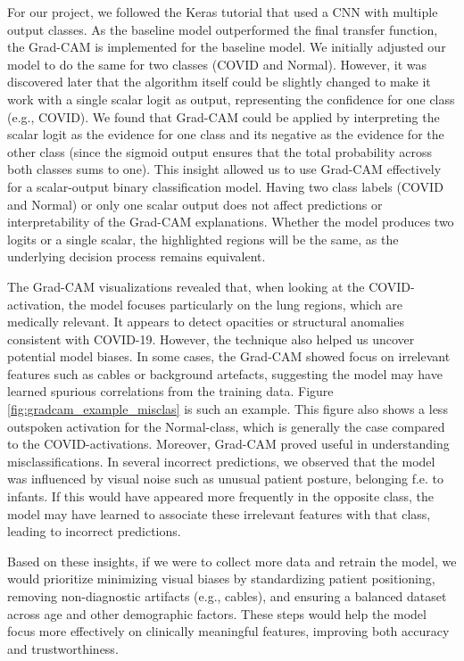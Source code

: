 \documentclass[conference]{IEEEtran}
\begin{document}
For our project, we followed the Keras tutorial \cite{KerasTutorial} that used a CNN with multiple output classes. As the baseline model outperformed the final transfer function, the Grad-CAM is implemented for the baseline model. We initially adjusted our model to do the same for two classes (COVID and Normal). However, it was discovered later that the algorithm itself could be slightly changed to make it work with a single scalar logit as output, representing the confidence for one class (e.g., COVID). We found that Grad-CAM could be applied by interpreting the scalar logit as the evidence for one class and its negative as the evidence for the other class (since the sigmoid output ensures that the total probability across both classes sums to one). This insight allowed us to use Grad-CAM effectively for a scalar-output binary classification model. Having two class labels (COVID and Normal) or only one scalar output does not affect predictions or interpretability of the Grad-CAM explanations. Whether the model produces two logits or a single scalar, the highlighted regions will be the same, as the underlying decision process remains equivalent.

The Grad-CAM visualizations revealed that, when looking at the COVID-activation, the model focuses particularly on the lung regions, which are medically relevant. It appears to detect opacities or structural anomalies consistent with COVID-19. However, the technique also helped us uncover potential model biases. In some cases, the Grad-CAM showed focus on irrelevant features such as cables or background artefacts, suggesting the model may have learned spurious correlations from the training data. Figure \ref{fig:gradcam_example_misclas} is such an example. This figure also shows a less outspoken activation for the Normal-class, which is generally the case compared to the COVID-activations.
Moreover, Grad-CAM proved useful in understanding misclassifications. In several incorrect predictions, we observed that the model was influenced by visual noise such as unusual patient posture, belonging f.e. to infants. If this would have appeared more frequently in the opposite class, the model may have learned to associate these irrelevant features with that class, leading to incorrect predictions. 

Based on these insights, if we were to collect more data and retrain the model, we would prioritize minimizing visual biases by standardizing patient positioning, removing non-diagnostic artifacts (e.g., cables), and ensuring a balanced dataset across age and other demographic factors. These steps would help the model focus more effectively on clinically meaningful features, improving both accuracy and trustworthiness.
\end{document}
